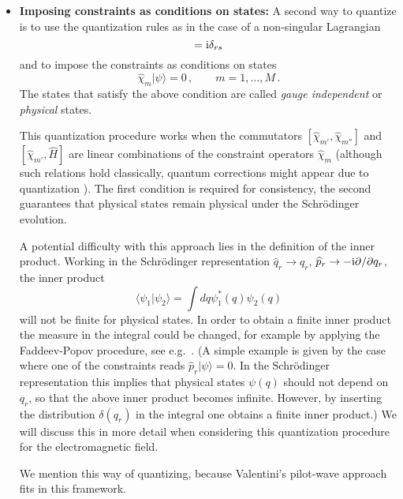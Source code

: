 \documentclass[12pt]{article}
\def\la{\langle}
\def\ra{\rangle}
\def\ii{\textrm i}
\begin{document}
\begin{itemize}
\item
{\bf Imposing constraints as conditions on states:} 
A second way to quantize is to use the quantization rules as in the case of a non-singular Lagrangian
\begin{equation}
[{\widehat q}_r,{\widehat p}_s] = \ii \delta_{rs}
\label{f.9}
\end{equation}
and to impose the constraints as conditions on states 
\begin{equation}
{\widehat \chi_m} |\psi \ra  =0\,, \qquad m=1,\dots,M\,.
\label{f.10}
\end{equation}
The states that satisfy the above condition are called {\em gauge independent} or {\em physical} states. 

This quantization procedure works when the commutators $[{\widehat \chi_{m'}}, {\widehat \chi_{m''}}]$ and $[{\widehat \chi_{m'}}, {\widehat H}]$ are linear combinations of the constraint operators ${\widehat \chi_m}$ (although such relations hold classically, quantum corrections might appear due to quantization \cite{sundermeyer82,henneaux91}). The first condition is required for consistency, the second guarantees that physical states remain physical under the Schr\"odinger evolution. 

A potential difficulty with this approach lies in the definition of the inner product. Working in the Schr\"odinger representation ${\widehat q}_r \to q_r$, ${\widehat p}_r \to - \ii \partial/ \partial q_r$, the inner product 
\begin{equation}
\la \psi_1 | \psi_2 \ra = \int dq \psi^*_1(q)  \psi_2 (q) 
\label{f.10.1}
\end{equation}
will not be finite for physical states. In order to obtain a finite inner product the measure in the integral could be changed, for example by applying the Faddeev-Popov procedure, see e.g.\ \cite[pp.\ 281-283]{henneaux91}. (A simple example is given by the case where one of the constraints reads ${\widehat p}_r  |\psi \ra= 0$. In the Schr\"odinger representation this implies that physical states $\psi(q)$ should not depend on $q_r$, so that the above inner product becomes infinite. However, by inserting the distribution $\delta(q_r)$ in the integral one obtains a finite inner product.) We will discuss this in more detail when considering this quantization procedure for the electromagnetic field.

We mention this way of quantizing, because Valentini's pilot-wave approach fits in this framework.
\end{itemize}
\end{document}
